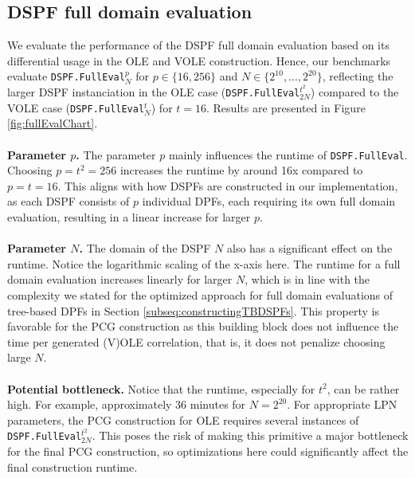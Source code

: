 \subsection{DSPF full domain evaluation}
We evaluate the performance of the DSPF full domain evaluation based on its differential usage in the OLE and VOLE construction. Hence, our benchmarks evaluate \texttt{DSPF.FullEval}$_N^p$ for $p\in\{16,256\}$ and $N\in\{2^{10}, ..., 2^{20}\}$, reflecting the larger DSPF instanciation in the OLE case (\texttt{DSPF.FullEval}$_{2N}^{t^2}$) compared to the VOLE case (\texttt{DSPF.FullEval}$_{N}^{t}$) for $t=16$. Results are presented in Figure \ref{fig:fullEvalChart}.
\\\\
\textbf{Parameter $p$.} The parameter $p$ mainly influences the runtime of \texttt{DSPF.FullEval}. Choosing $p=t^2=256$ increases the runtime by around 16x compared to $p=t=16$. This aligns with how DSPFs are constructed in our implementation, as each DSPF consists of $p$ individual DPFs, each requiring its own full domain evaluation, resulting in a linear increase for larger $p$.
\\\\
\textbf{Parameter $N$.} The domain of the DSPF $N$ also has a significant effect on the runtime. Notice the logarithmic scaling of the x-axis here. The runtime for a full domain evaluation increases linearly for larger $N$, which is in line with the complexity we stated for the optimized approach for full domain evaluations of tree-based DPFs in Section \ref{subseq:constructingTBDSPFs}. This property is favorable for the PCG construction as this building block does not influence the time per generated (V)OLE correlation, that is, it does not penalize choosing large $N$.
\\\\
\textbf{Potential bottleneck.} Notice that the runtime, especially for $t^2$, can be rather high. For example, approximately 36 minutes for $N=2^{20}$. For appropriate LPN parameters, the PCG construction for OLE requires several instances of \texttt{DSPF.FullEval}$_{2N}^{t^2}$. This poses the risk of making this primitive a major bottleneck for the final PCG construction, so optimizations here could significantly affect the final construction runtime.
\\\\
